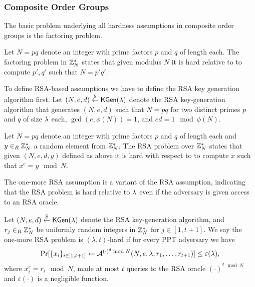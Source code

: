 \subsubsection{Composite Order Groups}
The basic problem underlying all hardness assumptions in composite order groups is the factoring problem.

\begin{definition}\label{def:factoring}
Let $N=pq$ denote an integer with prime factors $p$ and $q$ of length \secpar each.
The factoring problem in $\mathbb{Z}^\ast_N$ states that given modulus $N$ it is hard relative to \secpar to compute $p',q'$ such that $N=p'q'$.
\eod
\end{definition}

\noindent
To define RSA-based assumptions we have to define the RSA key generation algorithm first.
Let $(N, e, d)\stackrel{\$}{\gets}\mathsf{KGen}(\lambda)$ denote the RSA key-generation algorithm that generates $(N, e, d)$ such that $N=pq$ for two distinct primes $p$ and $q$ of size $\lambda$ each, $\gcd(e, \phi(N))=1$, and $ed=1\mod \phi(N)$.

\begin{definition}\label{def:rsa}
Let $N=pq$ denote an integer with prime factors $p$ and $q$ of length \secpar each and $y\in_R\mathbb{Z}^\ast_N$ a random element from $\mathbb{Z}^\ast_N$.
The RSA problem over $\mathbb{Z}^\ast_N$ states that given $(N,e,d,y)$ defined as above it is hard with respect to \secpar to compute $x$ such that $x^e = y \mod N$.
\eod
\end{definition}

\noindent
The one-more RSA assumption is a variant of the RSA assumption, indicating that the RSA problem is hard relative to $\lambda$ even if the adversary is given access to an RSA oracle.

\begin{definition}\label{def:onemoreRSA}
Let $(N, e, d)\stackrel{\$}{\gets}\mathsf{KGen}(\lambda)$ denote the RSA key-generation algorithm, and $r_j\in_R\mathbb{Z}^\ast_N$ be uniformly random integers in $\mathbb{Z}^\ast_N$ for $j\in[1,t+1]$.
We say the one-more RSA problem is $(\lambda, t)$-hard if for every \ac{PPT} adversary \cA we have
\[ \Pr[\{x_i\}_{i\in[1,t+1]} \gets \mathcal{A}^{(\cdot)^d \bmod N}(N, e, \lambda, r_1, \dots, r_{t+1})] \leq \varepsilon(\lambda), \]
where $x_i^e=r_i\mod N$, \cA made at most $t$ queries to the RSA oracle $(\cdot)^{^d \mod N}$ and $\varepsilon(\cdot)$ is a negligible function.
\eod
\end{definition}


